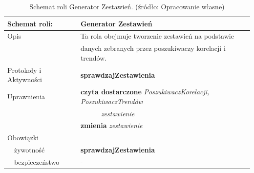 \documentclass[11pt]{report}
\begin{document}
    \begin{table}[ht!]
        \begin{tabular}{ll}
            Schemat roli:          & Generator Zestawień                                                          \\ \hline
            Opis                   & Ta rola obejmuje tworzenie zestawień na podstawie                            \\
            & danych zebranych przez poszukiwaczy korelacji i trendów.                     \\
            Protokoły i Aktywności & \textbf{sprawdzajZestawienia}                                                \\
            Uprawnienia            & \textbf{czyta dostarczone} \textit{PoszukiwaczKorelacji, PoszukiwaczTrendów} \\
            & ~~~~~~\textit{zestawienie}                                                   \\
            & \textbf{zmienia} \textit{zestawienie}                                        \\
            Obowiązki              &                                                                              \\
            ~~żywotność            & \textbf{sprawdzajZestawienia}                                                \\
            ~~bezpieczeństwo       & -                                                                            \\
        \end{tabular}
        \caption{Schemat roli Generator Zestawień. (źródło: Opracowanie własne)}
        \label{tab:schemat roli Generator Zestawień}
    \end{table}
\end{document}
